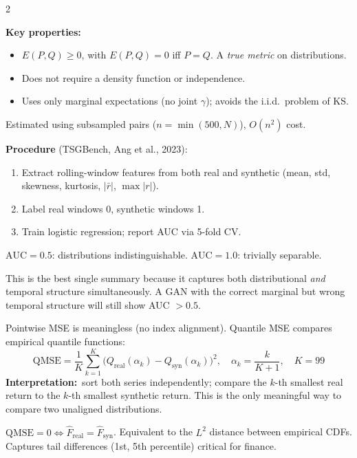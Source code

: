 \documentclass[10pt]{article}
\newcommand{\tealbox}[2]{\begin{tcolorbox}[mybox={Teal}{LBg},title={#1}]#2\end{tcolorbox}}
\newcommand{\amberbox}[2]{\begin{tcolorbox}[mybox={Amber}{ABg},title={#1}]#2\end{tcolorbox}}
\begin{document}
\begin{multicols}{2}
{\textbf{Key properties:}
\begin{itemize}
  \item $E(P,Q) \geq 0$, with $E(P,Q) = 0$ iff $P = Q$. A \emph{true metric} on distributions.
  \item Does not require a density function or independence.
  \item Uses only marginal expectations (no joint $\gamma$); avoids the i.i.d.\ problem of KS.
\end{itemize}
Estimated using subsampled pairs ($n = \min(500, N)$), $O(n^2)$ cost.}

\tealbox{4.\ Discriminative AUC --- The Holistic Score}{%
\textbf{Procedure} (TSGBench, Ang et al., 2023):
\begin{enumerate}
  \item Extract rolling-window features from both real and synthetic (mean, std, skewness, kurtosis, $|\bar{r}|$, $\max|r|$).
  \item Label real windows 0, synthetic windows 1.
  \item Train logistic regression; report AUC via 5-fold CV.
\end{enumerate}
$\text{AUC} = 0.5$: distributions indistinguishable. $\text{AUC} = 1.0$: trivially separable.

This is the best single summary because it captures both distributional \emph{and} temporal structure simultaneously. A GAN with the correct marginal but wrong temporal structure will still show AUC $> 0.5$.}

\amberbox{5.\ Quantile MSE --- Proper Distribution Shape Comparison}{%
Pointwise MSE is meaningless (no index alignment). Quantile MSE compares empirical quantile functions:
\begin{equation*}
  \text{QMSE} = \frac{1}{K}\sum_{k=1}^K
    \bigl(Q_\text{real}(\alpha_k) - Q_\text{syn}(\alpha_k)\bigr)^2,
  \quad \alpha_k = \frac{k}{K+1},\quad K = 99
\end{equation*}
\textbf{Interpretation:}\ sort both series independently; compare the $k$-th smallest real return to the $k$-th smallest synthetic return. This is the only meaningful way to compare two unaligned distributions.

$\text{QMSE} = 0 \Leftrightarrow \hat{F}_\text{real} = \hat{F}_\text{syn}$. Equivalent to the $L^2$ distance between empirical CDFs. Captures tail differences (1st, 5th percentile) critical for finance.}

\end{multicols}
\end{document}
